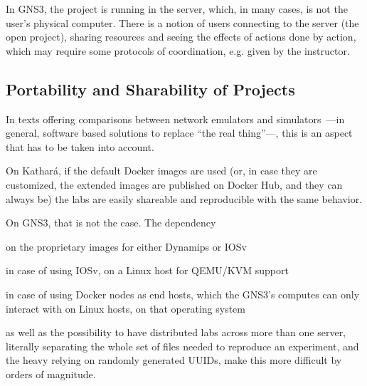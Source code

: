 In GNS3, the project is running in the server, which, in many cases, is not the user's physical computer.
There is a notion of users connecting to the server (the open project), sharing resources and seeing the effects of actions done by action, which may require some protocols of coordination, e.g. given by the instructor.

\subsection{Portability and Sharability of Projects}
\label{subsec:comparativeportability}
In texts offering comparisons between network emulators and simulators~\cite{netkit-full,reproduciblenetexp}---in general, software based solutions to replace ``the real thing''---, this is an aspect that has to be taken into account.

On Kathará, if the default Docker images are used (or, in case they are customized, the extended images are published on Docker Hub, and they can always be) the labs are easily shareable and reproducible with the same behavior.

On GNS3, that is not the case.
The dependency
  \begin{enumerate*}[label=(\roman*), itemjoin={{, }}, itemjoin*={{, and }}]
  \item on the proprietary images for either Dynamips or IOSv
  \item in case of using IOSv, on a Linux host for QEMU/KVM support
  \item in case of using Docker nodes as end hosts, which the GNS3's computes can only interact with on Linux hosts, on that operating system
  \end{enumerate*}
as well as the possibility to have distributed labs across more than one server, literally separating the whole set of files needed to reproduce an experiment, and the heavy relying on randomly generated UUIDs, make this more difficult by orders of magnitude. %

